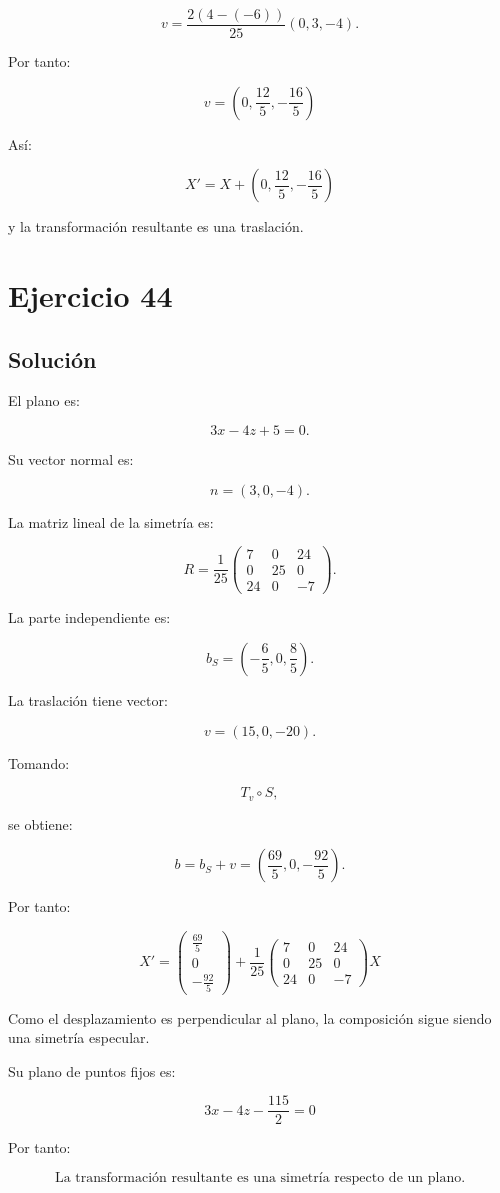 \documentclass[11pt,a4paper]{article}
\begin{document}
\[
v
=
\frac{2(4-(-6))}{25}(0,3,-4).
\]

Por tanto:

\[
\boxed{
v=
\left(
0,\frac{12}{5},-\frac{16}{5}
\right)
}
\]

Así:

\[
\boxed{
X'
=
X+
\left(
0,\frac{12}{5},-\frac{16}{5}
\right)
}
\]

y la transformación resultante es una traslación.

\section{Ejercicio 44}
\subsection{Solución}

El plano es:

\[
3x-4z+5=0.
\]

Su vector normal es:

\[
n=(3,0,-4).
\]

La matriz lineal de la simetría es:

\[
R=
\frac1{25}
\begin{pmatrix}
7&0&24\\
0&25&0\\
24&0&-7
\end{pmatrix}.
\]

La parte independiente es:

\[
b_S
=
\left(
-\frac65,0,\frac85
\right).
\]

La traslación tiene vector:

\[
v=(15,0,-20).
\]

Tomando:

\[
T_v\circ S,
\]

se obtiene:

\[
b=b_S+v
=
\left(
\frac{69}{5},0,-\frac{92}{5}
\right).
\]

Por tanto:

\[
\boxed{
X'
=
\begin{pmatrix}
\frac{69}{5}\\[1mm]
0\\[1mm]
-\frac{92}{5}
\end{pmatrix}
+
\frac1{25}
\begin{pmatrix}
7&0&24\\
0&25&0\\
24&0&-7
\end{pmatrix}
X
}
\]

Como el desplazamiento es perpendicular al plano, la composición sigue siendo una simetría especular.

Su plano de puntos fijos es:

\[
\boxed{
3x-4z-\frac{115}{2}=0
}
\]

Por tanto:

\[
\boxed{
\text{La transformación resultante es una simetría respecto de un plano.}
}
\]
\end{document}
